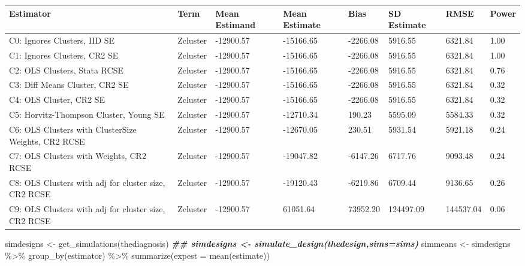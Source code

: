 \documentclass[
  12pt,
]{book}
\newenvironment{Shaded}{\begin{snugshade}}{\end{snugshade}}
\newcommand{\AttributeTok}[1]{\textcolor[rgb]{0.77,0.63,0.00}{#1}}
\newcommand{\DocumentationTok}[1]{\textcolor[rgb]{0.56,0.35,0.01}{\textbf{\textit{#1}}}}
\newcommand{\FunctionTok}[1]{\textcolor[rgb]{0.00,0.00,0.00}{#1}}
\newcommand{\NormalTok}[1]{#1}
\newcommand{\OtherTok}[1]{\textcolor[rgb]{0.56,0.35,0.01}{#1}}
\newcommand{\SpecialCharTok}[1]{\textcolor[rgb]{0.00,0.00,0.00}{#1}}
\theoremstyle{definition}
\theoremstyle{definition}
\theoremstyle{definition}
\theoremstyle{remark}
\begin{document}
\begin{tabular}{l|l|l|l|l|l|l|l}
\hline
Estimator & Term & Mean Estimand & Mean Estimate & Bias & SD Estimate & RMSE & Power\\
\hline
C0: Ignores Clusters, IID SE & Zcluster & -12900.57 & -15166.65 & -2266.08 & 5916.55 & 6321.84 & 1.00\\
\hline
C1: Ignores Clusters, CR2 SE & Zcluster & -12900.57 & -15166.65 & -2266.08 & 5916.55 & 6321.84 & 1.00\\
\hline
C2: OLS Clusters, Stata RCSE & Zcluster & -12900.57 & -15166.65 & -2266.08 & 5916.55 & 6321.84 & 0.76\\
\hline
C3: Diff Means Cluster, CR2 SE & Zcluster & -12900.57 & -15166.65 & -2266.08 & 5916.55 & 6321.84 & 0.32\\
\hline
C4: OLS Cluster, CR2 SE & Zcluster & -12900.57 & -15166.65 & -2266.08 & 5916.55 & 6321.84 & 0.32\\
\hline
C5: Horvitz-Thompson Cluster, Young SE & Zcluster & -12900.57 & -12710.34 & 190.23 & 5595.09 & 5584.33 & 0.32\\
\hline
C6: OLS Clusters with ClusterSize Weights, CR2 RCSE & Zcluster & -12900.57 & -12670.05 & 230.51 & 5931.54 & 5921.18 & 0.24\\
\hline
C7: OLS Clusters with Weights, CR2 RCSE & Zcluster & -12900.57 & -19047.82 & -6147.26 & 6717.76 & 9093.48 & 0.24\\
\hline
C8: OLS Clusters with adj for cluster size, CR2 RCSE & Zcluster & -12900.57 & -19120.43 & -6219.86 & 6709.44 & 9136.65 & 0.26\\
\hline
C9: OLS Clusters with adj for cluster size, CR2 RCSE & Zcluster & -12900.57 & 61051.64 & 73952.20 & 124497.09 & 144537.04 & 0.06\\
\hline
\end{tabular}

\begin{Shaded}
\begin{Highlighting}[]
\NormalTok{simdesigns }\OtherTok{\textless{}{-}} \FunctionTok{get\_simulations}\NormalTok{(thediagnosis)}
\DocumentationTok{\#\# simdesigns \textless{}{-} simulate\_design(thedesign,sims=sims)}
\NormalTok{simmeans }\OtherTok{\textless{}{-}}\NormalTok{ simdesigns }\SpecialCharTok{\%\textgreater{}\%}
  \FunctionTok{group\_by}\NormalTok{(estimator) }\SpecialCharTok{\%\textgreater{}\%}
  \FunctionTok{summarize}\NormalTok{(}\AttributeTok{expest =} \FunctionTok{mean}\NormalTok{(estimate))}
\end{Highlighting}
\end{Shaded}
\end{document}
